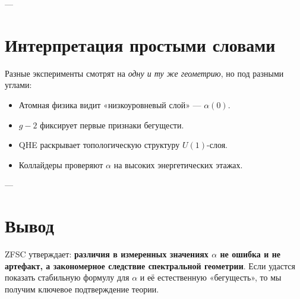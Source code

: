 \documentclass[a4paper,12pt]{article}
\begin{document}
---

\section{Интерпретация простыми словами}
Разные эксперименты смотрят на \emph{одну и ту же геометрию}, но под разными углами:
\begin{itemize}
  \item Атомная физика видит «низкоуровневый слой» — $\alpha(0)$.  
  \item $g-2$ фиксирует первые признаки бегущести.  
  \item QHE раскрывает топологическую структуру $U(1)$-слоя.  
  \item Коллайдеры проверяют $\alpha$ на высоких энергетических этажах.  
\end{itemize}

---

\section{Вывод}
ZFSC утверждает: \textbf{различия в измеренных значениях $\alpha$ не ошибка и не артефакт,
а закономерное следствие спектральной геометрии}.
Если удастся показать стабильную формулу для $\alpha$ и её естественную «бегущесть»,
то мы получим ключевое подтверждение теории.
\end{document}
